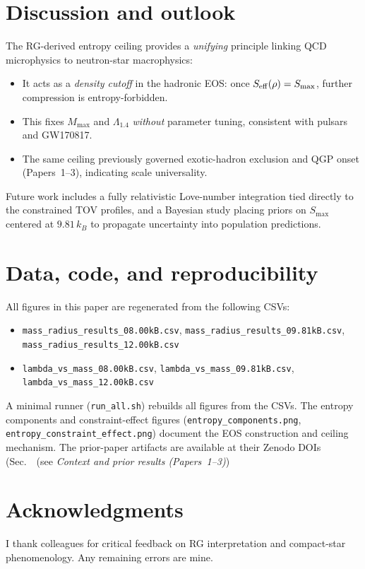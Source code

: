 \documentclass[11pt]{article}
\begin{document}
\section{Discussion and outlook}
\label{sec:discussion}
The RG-derived entropy ceiling provides a \emph{unifying} principle linking QCD microphysics to neutron-star macrophysics:
\begin{itemize}[leftmargin=1.2em]
\item It acts as a \emph{density cutoff} in the hadronic EOS: once $S_{\rm eff}(\rho)=S_{\max}$, further compression is entropy-forbidden. 
\item This fixes $M_{\max}$ and $\Lambda_{1.4}$ \emph{without} parameter tuning, consistent with pulsars and GW170817.
\item The same ceiling previously governed exotic-hadron exclusion and QGP onset (Papers~1--3), indicating scale universality.
\end{itemize}
Future work includes a fully relativistic Love-number integration tied directly to the constrained TOV profiles, and a Bayesian study placing priors on $S_{\max}$ centered at $9.81\,k_B$ to propagate uncertainty into population predictions.

\section*{Data, code, and reproducibility}
\noindent
All figures in this paper are regenerated from the following CSVs:
\begin{itemize}[leftmargin=1.2em]
\item \texttt{mass\_radius\_results\_08.00kB.csv}, 
\texttt{mass\_radius\_results\_09.81kB.csv}, 
\texttt{mass\_radius\_results\_12.00kB.csv}
\item \texttt{lambda\_vs\_mass\_08.00kB.csv}, 
\texttt{lambda\_vs\_mass\_09.81kB.csv}, 
\texttt{lambda\_vs\_mass\_12.00kB.csv}
\end{itemize}
A minimal runner (\texttt{run\_all.sh}) rebuilds all figures from the CSVs. The entropy components and constraint-effect figures (\texttt{entropy\_components.png}, \texttt{entropy\_constraint\_effect.png}) document the EOS construction and ceiling mechanism. The prior-paper artifacts are available at their Zenodo DOIs (Sec.~\ (see \textit{Context and prior results (Papers~1--3)})

\section*{Acknowledgments}
I thank colleagues for critical feedback on RG interpretation and compact-star phenomenology. Any remaining errors are mine.
\end{document}
